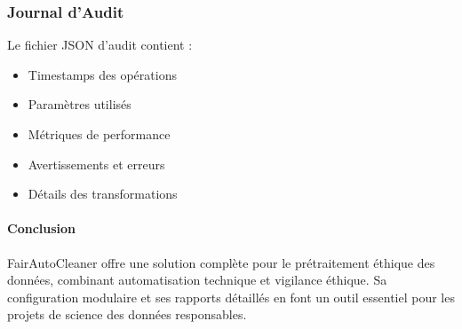 \subsubsection{Journal d'Audit}
Le fichier JSON d'audit contient :
\begin{itemize}
    \item Timestamps des opérations
    \item Paramètres utilisés
    \item Métriques de performance
    \item Avertissements et erreurs
    \item Détails des transformations
\end{itemize}

\paragraph*{Conclusion}
FairAutoCleaner offre une solution complète pour le prétraitement éthique des données, combinant automatisation technique et vigilance éthique. Sa configuration modulaire et ses rapports détaillés en font un outil essentiel pour les projets de science des données responsables.


